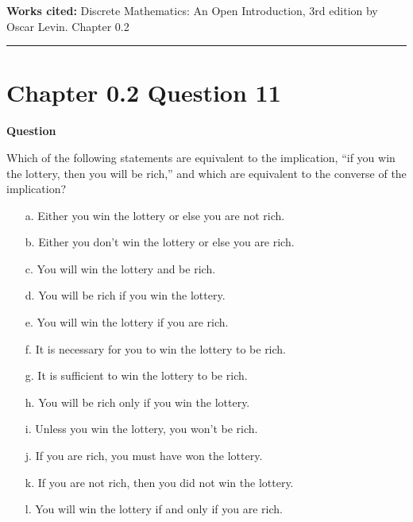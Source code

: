 \documentclass{article}
\begin{document}
\vspace{0.5cm}
\textbf{Works cited:}
Discrete Mathematics: An Open Introduction, 3rd edition by Oscar Levin. Chapter 0.2


\vspace{0.5cm}
\hrule
\vspace{0.5cm}

\section*{Chapter 0.2 Question 11} 

\textbf{Question}

Which of the following statements are equivalent to the implication, “if you win the lottery, then you will be rich,” and which are equivalent to the converse of the implication?

\begin{enumerate}
    \item[a.] Either you win the lottery or else you are not rich.

    \item[b.] Either you don't win the lottery or else you are rich.

    \item[c.] You will win the lottery and be rich.

    \item[d.] You will be rich if you win the lottery.

    \item[e.] You will win the lottery if you are rich.

    \item[f.] It is necessary for you to win the lottery to be rich.

    \item[g.] It is sufficient to win the lottery to be rich.

    \item[h.] You will be rich only if you win the lottery.

    \item[i.] Unless you win the lottery, you won't be rich.

    \item[j.] If you are rich, you must have won the lottery.

    \item[k.] If you are not rich, then you did not win the lottery.

    \item[l.] You will win the lottery if and only if you are rich.
\end{enumerate}
\end{document}
